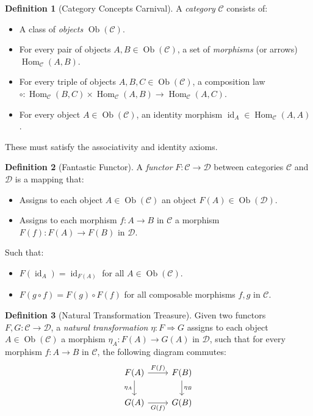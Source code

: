 \documentclass{article}
\theoremstyle{definition}
\newtheorem{definition}{Definition}[section]
\theoremstyle{remark}
\begin{document}
	\begin{definition}[Category Concepts Carnival]
		A \emph{category} $\mathcal{C}$ consists of:
		\begin{itemize}
			\item A class of \emph{objects} $\operatorname{Ob}(\mathcal{C})$.
			\item For every pair of objects $A, B \in \operatorname{Ob}(\mathcal{C})$, a set of \emph{morphisms} (or arrows) $\operatorname{Hom}_{\mathcal{C}}(A, B)$.
			\item For every triple of objects $A, B, C \in \operatorname{Ob}(\mathcal{C})$, a composition law $\circ: \operatorname{Hom}_{\mathcal{C}}(B, C) \times \operatorname{Hom}_{\mathcal{C}}(A, B) \rightarrow \operatorname{Hom}_{\mathcal{C}}(A, C)$.
			\item For every object $A \in \operatorname{Ob}(\mathcal{C})$, an identity morphism $\operatorname{id}_A \in \operatorname{Hom}_{\mathcal{C}}(A, A)$.
		\end{itemize}
		These must satisfy the associativity and identity axioms.
	\end{definition}
	
	\begin{definition}[Fantastic Functor]
		A \emph{functor} $F: \mathcal{C} \rightarrow \mathcal{D}$ between categories $\mathcal{C}$ and $\mathcal{D}$ is a mapping that:
		\begin{itemize}
			\item Assigns to each object $A \in \operatorname{Ob}(\mathcal{C})$ an object $F(A) \in \operatorname{Ob}(\mathcal{D})$.
			\item Assigns to each morphism $f: A \rightarrow B$ in $\mathcal{C}$ a morphism $F(f): F(A) \rightarrow F(B)$ in $\mathcal{D}$.
		\end{itemize}
		Such that:
		\begin{itemize}
			\item $F(\operatorname{id}_A) = \operatorname{id}_{F(A)}$ for all $A \in \operatorname{Ob}(\mathcal{C})$.
			\item $F(g \circ f) = F(g) \circ F(f)$ for all composable morphisms $f, g$ in $\mathcal{C}$.
		\end{itemize}
	\end{definition}
	
	\begin{definition}[Natural Transformation Treasure]
		Given two functors $F, G: \mathcal{C} \rightarrow \mathcal{D}$, a \emph{natural transformation} $\eta: F \Rightarrow G$ assigns to each object $A \in \operatorname{Ob}(\mathcal{C})$ a morphism $\eta_A: F(A) \rightarrow G(A)$ in $\mathcal{D}$, such that for every morphism $f: A \rightarrow B$ in $\mathcal{C}$, the following diagram commutes:
		\[
		\begin{tikzcd}
			F(A) \arrow[r, "F(f)"] \arrow[d, "\eta_A"'] & F(B) \arrow[d, "\eta_B"] \\
			G(A) \arrow[r, "G(f)"'] & G(B)
		\end{tikzcd}
		\]
	\end{definition}
	
\end{document}
